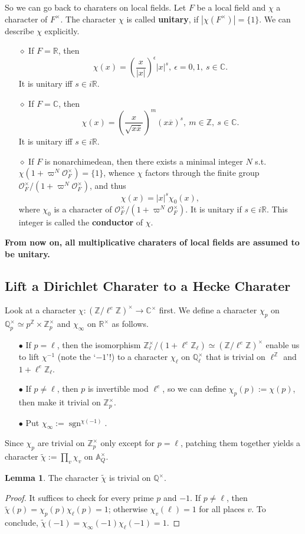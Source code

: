 \documentclass{article}
\theoremstyle{definition}
\newtheorem{lemma}{Lemma}[section]
\theoremstyle{remark}
\renewcommand{\bar}{\overline}
\renewcommand{\tilde}{\widetilde}
\newcommand{\R}{\mathbb{R}}
\newcommand{\C}{\mathbb{C}}
\newcommand{\Q}{\mathbb{Q}}
\newcommand{\Z}{\mathbb{Z}}
\DeclareMathOperator{\sgn}{sgn} %
\newcommand{\idele}[1]{\mathbb{A}_{#1}^{\times}}
\renewcommand{\O}{\mathcal{O}}
\newcommand{\myit}{$\diamond$}
\begin{document}
So we can go back to charaters on local fields. Let $F$ be a local field and $\chi$ a character of $F^{\times}$. The character $\chi$ is called \textbf{unitary}, if $|\chi(F^{\times})| = \{1\}$.
We can describe $\chi$ explicitly.
\begin{enumerate}
    \item [\myit] If $F = \R$, then \[\chi(x) = \left( \frac{x}{|x|} \right)^{\epsilon}|x|^s,\ \epsilon = 0, 1,\ s\in\C.\] It is unitary iff $s\in i\R$.
    \item [\myit] If $F = \C$, then \[\chi(x) = \left( \frac{x}{\sqrt{x\bar{x}}} \right)^m(x\bar{x})^s,\ m\in\Z,\ s\in\C.\] It is unitary iff $s\in i\R$.
    \item [\myit] If $F$ is nonarchimedean, then there exists a minimal integer $N$ s.t. $\chi(1 + \varpi^N\O_F^\times) = \{1\}$, whence $\chi$ factors through the finite group $\O_F^\times/(1 + \varpi^N\O_F^\times)$, and thus \[\chi(x) = |x|^s\chi_0(x),\] where $\chi_0$ is a character of $\O_F^\times/(1 + \varpi^N\O_F^\times)$.
    It is unitary if $s\in i\R$. 
    This integer is called the \textbf{conductor} of $\chi$. 
\end{enumerate}

\textbf{From now on, all multiplicative charaters of local fields are assumed to be unitary.}

\subsection{Lift a Dirichlet Charater to a Hecke Charater}
Look at a character $\chi : (\Z/\ell^e\Z)^\times\to\C^\times$ first.
We define a character $\chi_p$ on $\Q_p^\times\simeq p^\Z\times\Z_p^\times$ and $\chi_\infty$ on $\R^\times$ as follows.
\begin{enumerate}
    \item [$\bullet$] If $p = \ell$, then the isomorphism $\Z_\ell^\times/(1+\ell^e\Z_\ell)\simeq (\Z/\ell^e\Z)^\times$ enable us to lift $\chi^{-1}$ (note the `$-1$'!) to a character $\chi_\ell$ on $\Q_\ell^\times$ that is trivial on $\ell^\Z$ and $1+\ell^e\Z_\ell$.
    \item [$\bullet$] If $p \ne \ell$, then $p$ is invertible mod $\ell^e$, so we can define $\chi_p(p) := \chi(p)$, then make it trivial on $\Z_p^\times$.
    \item [$\bullet$] Put $\chi_\infty := \sgn^{\chi(-1)}$.
\end{enumerate}
Since $\chi_p$ are trivial on $\Z_p^\times$ only except for $p = \ell$, patching them together yields a character $\tilde{\chi}:=\prod_v\chi_v$ on $\idele{Q}$.
\begin{lemma}
   The character $\tilde{\chi}$ is trivial on $\Q^\times$.
\end{lemma}
\begin{proof}
    It suffices to check for every prime $p$ and $-1$.
    If $p \ne \ell$, then $\tilde{\chi}(p) = \chi_p(p)\chi_\ell(p) = 1$; otherwise $\chi_v(\ell) = 1$ for all places $v$.
    To conclude, $\tilde{\chi}(-1) = \chi_\infty(-1)\chi_\ell(-1) = 1$.
\end{proof}
\end{document}
